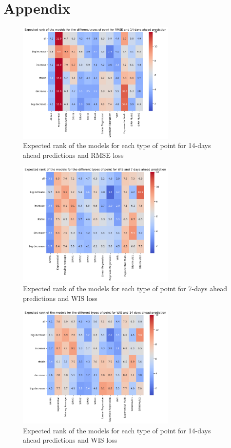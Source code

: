 \section{Appendix}
\label{sec:appendix}



\begin{figure}[H]
    \centering
    \includegraphics[width=0.7\textwidth]{figures/heatmap_RMSE_14.png}
    \caption{Expected rank of the models for each type of point for 14-days ahead predictions and RMSE loss}
    \label{fig:heatmap_RMSE_14}
\end{figure}

\begin{figure}[H]
    \centering
    \includegraphics[width=0.7\textwidth]{figures/heatmap_WIS_7.png}
    \caption{Expected rank of the models for each type of point for 7-days ahead predictions and WIS loss}
    \label{fig:heatmap_WIS_7}
\end{figure}


\begin{figure}[H]
    \centering
    \includegraphics[width=0.7\textwidth]{figures/heatmap_WIS_14.png}
    \caption{Expected rank of the models for each type of point for 14-days ahead predictions and WIS loss}
    \label{fig:heatmap_WIS_14}
\end{figure}